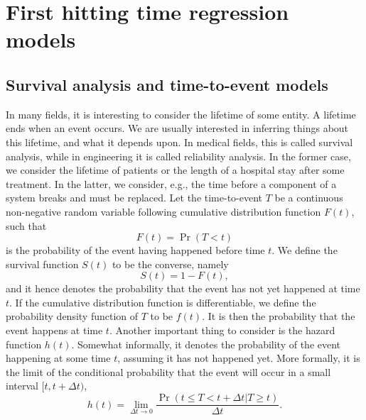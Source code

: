 \chapter{First hitting time regression models}

\section{Survival analysis and time-to-event models}\label{sec:survival}
In many fields, it is interesting to consider the lifetime of some entity. A lifetime ends when an event occurs. We are usually interested in inferring things about this lifetime, and what it depends upon. In medical fields, this is called survival analysis, while in engineering it is called reliability analysis. In the former case, we consider the lifetime of patients or the length of a hospital stay after some treatment. In the latter, we consider, e.g., the time before a component of a system breaks and must be replaced. Let the time-to-event $T$ be a continuous non-negative random variable following cumulative distribution function $F(t)$, such that
\begin{equation*}%
    F(t)=\Pr(T<t)
\end{equation*}
is the probability of the event having happened before time $t$. We define the survival function $S(t)$ to be the converse, namely
\begin{equation*}%
    S(t)=1-F(t),
\end{equation*}
and it hence denotes the probability that the event has not yet happened at time $t$. If the cumulative distribution function is differentiable, we define the probability density function of $T$ to be $f(t)$. It is then the probability that the event happens at time $t$. Another important thing to consider is the hazard function $h(t)$. Somewhat informally, it denotes the probability of the event happening at some time $t$, assuming it has not happened yet. More formally, it is the limit of the conditional probability that the event will occur in a small interval $[t,t+\Delta t)$,
\begin{equation*}%
h(t)=\lim_{\Delta t\to 0}\frac{\Pr(t\leq T<t+\Delta t|T\geq t)}{\Delta t}.
\end{equation*}

